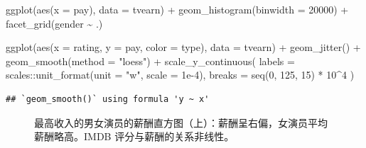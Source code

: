 \documentclass[
  b5paper,
  UTF8,twoside]{book}
\newenvironment{Shaded}{\begin{snugshade}}{\end{snugshade}}
\newcommand{\AttributeTok}[1]{\textcolor[rgb]{0.77,0.63,0.00}{#1}}
\newcommand{\DecValTok}[1]{\textcolor[rgb]{0.00,0.00,0.81}{#1}}
\newcommand{\FloatTok}[1]{\textcolor[rgb]{0.00,0.00,0.81}{#1}}
\newcommand{\FunctionTok}[1]{\textcolor[rgb]{0.00,0.00,0.00}{#1}}
\newcommand{\NormalTok}[1]{#1}
\newcommand{\SpecialCharTok}[1]{\textcolor[rgb]{0.00,0.00,0.00}{#1}}
\newcommand{\StringTok}[1]{\textcolor[rgb]{0.31,0.60,0.02}{#1}}
\begin{document}
\begin{Shaded}
\begin{Highlighting}[]
\FunctionTok{ggplot}\NormalTok{(}\FunctionTok{aes}\NormalTok{(}\AttributeTok{x =}\NormalTok{ pay), }\AttributeTok{data =}\NormalTok{ tvearn) }\SpecialCharTok{+}
  \FunctionTok{geom\_histogram}\NormalTok{(}\AttributeTok{binwidth =} \DecValTok{20000}\NormalTok{) }\SpecialCharTok{+}
  \FunctionTok{facet\_grid}\NormalTok{(gender }\SpecialCharTok{\textasciitilde{}}\NormalTok{ .)}

\FunctionTok{ggplot}\NormalTok{(}\FunctionTok{aes}\NormalTok{(}\AttributeTok{x =}\NormalTok{ rating, }\AttributeTok{y =}\NormalTok{ pay, }\AttributeTok{color =}\NormalTok{ type), }\AttributeTok{data =}\NormalTok{ tvearn) }\SpecialCharTok{+}
  \FunctionTok{geom\_jitter}\NormalTok{() }\SpecialCharTok{+}
  \FunctionTok{geom\_smooth}\NormalTok{(}\AttributeTok{method =} \StringTok{"loess"}\NormalTok{) }\SpecialCharTok{+}
  \FunctionTok{scale\_y\_continuous}\NormalTok{(}
    \AttributeTok{labels =}\NormalTok{ scales}\SpecialCharTok{::}\FunctionTok{unit\_format}\NormalTok{(}\AttributeTok{unit =} \StringTok{"w"}\NormalTok{, }\AttributeTok{scale =} \FloatTok{1e{-}4}\NormalTok{),}
    \AttributeTok{breaks =} \FunctionTok{seq}\NormalTok{(}\DecValTok{0}\NormalTok{, }\DecValTok{125}\NormalTok{, }\DecValTok{15}\NormalTok{) }\SpecialCharTok{*} \DecValTok{10}\SpecialCharTok{\^{}}\DecValTok{4}
\NormalTok{  )}
\end{Highlighting}
\end{Shaded}

\begin{verbatim}
## `geom_smooth()` using formula 'y ~ x'
\end{verbatim}

\begin{figure}

{\centering {}\newline{}

}

\caption[演员的薪酬直方图及薪酬与电视剧评分的散点图]{最高收入的男女演员的薪酬直方图（上）：薪酬呈右偏，女演员平均薪酬略高。IMDB 评分与薪酬的关系非线性。}\label{fig:tvearn}
\end{figure}
\end{document}
